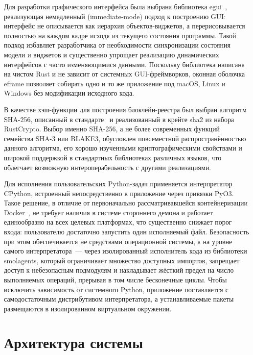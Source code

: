\documentclass[a4paper,11pt]{extarticle}
\begin{document}
Для разработки графического интерфейса была выбрана библиотека
egui~\cite{egui_crate}, реализующая немедленный (immediate-mode) подход к
построению GUI: интерфейс не описывается как иерархия объектов-виджетов, а
перерисовывается полностью на каждом кадре исходя из текущего состояния
программы. Такой подход избавляет разработчика от необходимости синхронизации
состояния модели и виджетов и существенно упрощает реализацию динамических
интерфейсов с часто изменяющимися данными. Поскольку библиотека написана на
чистом Rust и не зависит от системных GUI-фреймворков, оконная оболочка eframe
позволяет собирать одно и то же приложение под macOS, Linux и Windows без
модификации исходного кода.

В качестве хэш-функции для построения блокчейн-реестра был выбран алгоритм
SHA-256, описанный в стандарте~\cite{fips_180_4} и реализованный в крейте sha2
из набора RustCrypto. Выбор именно SHA-256, а не более современных функций
семейства SHA-3 или BLAKE3, обусловлен повсеместной распространённостью данного
алгоритма, его хорошо изученными криптографическими свойствами и широкой
поддержкой в стандартных библиотеках различных языков, что облегчает возможную
интероперабельность с другими реализациями.

Для исполнения пользовательских Python-задач применяется интерпретатор CPython,
встроенный непосредственно в приложение через привязки PyO3. Такое решение, в
отличие от первоначально рассматривавшейся контейнеризации
Docker~\cite{merkel_docker, docker_docs}, не требует наличия в системе
стороннего демона и работает единообразно на всех целевых платформах, что
существенно снижает порог входа: пользователю достаточно запустить один
исполняемый файл. Безопасность при этом обеспечивается не средствами
операционной системы, а на уровне самого интерпретатора~--- через изолированный
исполнитель кода из библиотеки smolagents, который ограничивает множество
доступных импортов, запрещает доступ к небезопасным подмодулям и накладывает
жёсткий предел на число выполняемых операций, прерывая в том числе бесконечные
циклы. Чтобы исключить зависимость от системного Python, приложение
поставляется с самодостаточным дистрибутивом интерпретатора, а устанавливаемые
пакеты размещаются в изолированном виртуальном окружении.

\section{Архитектура системы}
\end{document}
